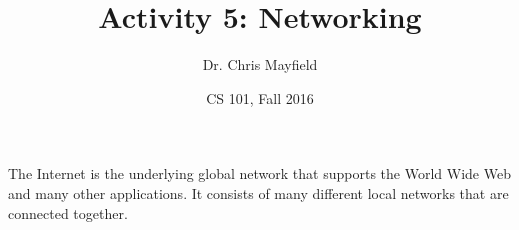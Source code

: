\documentclass[12pt]{article}
\title{Activity 5: Networking}
\author{Dr. Chris Mayfield}
\date{CS 101, Fall 2016}
\begin{document}
\maketitle

The Internet is the underlying global network that supports the World Wide Web and many other applications. It consists of many different local networks that are connected together. 


\newpage

\end{document}
